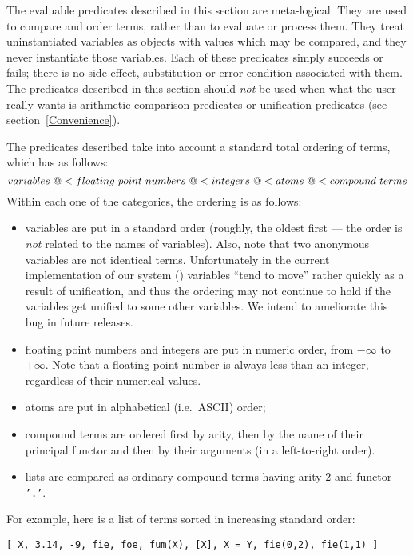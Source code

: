 The evaluable predicates described in this section are meta-logical.
They are used to compare and order terms, rather than to evaluate or 
process them.  They treat uninstantiated variables as objects with values
which may be compared, and they never instantiate those variables.
Each of these predicates simply succeeds or fails; there is no 
side-effect, substitution or error condition associated with them.
The predicates described in this section should {\em not} be used when 
what the user really wants is arithmetic comparison predicates
or unification predicates (see section~\ref{Convenience}).

The predicates described take into account a standard total ordering 
of terms, which has as follows:
	\[		variables 
	   \ {\tt @<} \ floating \ point \ numbers
	   \ {\tt @<} \ integers 
	   \ {\tt @<} \ atoms 
	   \ {\tt @<} \ compound \ terms \]
Within each one of the categories, the ordering is as follows:
\begin{itemize}
\item	variables are put in a standard order (roughly, the oldest first
	--- the order is {\em not\/} related to the names of variables).
	Also, note that two anonymous variables are not identical terms.
	Unfortunately in the current implementation of our system (\version) 
	variables ``tend to move'' rather quickly as a result of unification,
	and thus the ordering may not continue to hold if the variables get
	unified to some other variables.  We intend to ameliorate this bug in
	future releases.
\item	floating point numbers and integers are put in numeric order, 
	from $-\infty$ to $+\infty$.  Note that a floating point number is
	always less than an integer, regardless of their numerical values.
\item	atoms are put in alphabetical (i.e.\ ASCII) order;
\item	compound terms are ordered first by arity, then by the name of their
	principal functor and then by their arguments (in a left-to-right 
	order).
\item	lists are compared as ordinary compound terms having arity 2 and 
	functor {\tt '.'}.
\end{itemize}
For example, here is a list of terms sorted in increasing standard order:
\begin{center}
	{\tt [ X, 3.14, -9, fie, foe, fum(X), [X], X = Y, fie(0,2), fie(1,1) ]}
\end{center}
